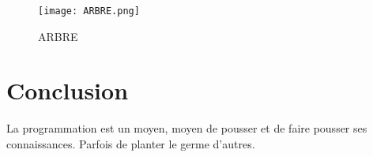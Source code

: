 \documentclass[conference]{IEEEtran}
\begin{document}
\begin{figure}[!t]
    \centering
    \texttt{[image: ARBRE.png]}
    \captionsetup{labelformat=empty}
    \caption{ARBRE}
    \label{fig:ARBRE} 
\end{figure}


\section{Conclusion}
La programmation est un moyen, moyen de pousser et de faire pousser ses connaissances. Parfois de planter le germe d'autres.
\end{document}
